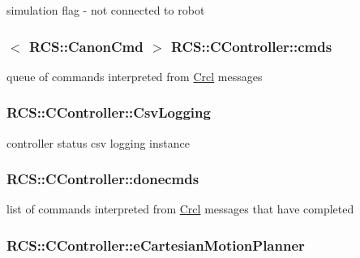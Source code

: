 simulation flag -\/ not connected to robot \hypertarget{structRCS_1_1CController_adceba05ebd7fa94f93c131db84840d29}{
\subsubsection[{cmds}]{$<$ {\bf R\-C\-S\-::\-Canon\-Cmd} $>$ R\-C\-S\-::\-C\-Controller\-::cmds\hspace{0.3cm}{\ttfamily [static]}}}\label{structRCS_1_1CController_adceba05ebd7fa94f93c131db84840d29}
queue of commands interpreted from \hyperlink{namespaceCrcl}{Crcl} messages \hypertarget{structRCS_1_1CController_a7e21b1156fe37407bae1ba468815206c}{
\subsubsection[{Csv\-Logging}]{ R\-C\-S\-::\-C\-Controller\-::\-Csv\-Logging\hspace{0.3cm}{\ttfamily [static]}}}\label{structRCS_1_1CController_a7e21b1156fe37407bae1ba468815206c}
controller status csv logging instance \hypertarget{structRCS_1_1CController_a093ccebe77526dc736b0ddff70dec0fc}{
\subsubsection[{donecmds}]{ R\-C\-S\-::\-C\-Controller\-::donecmds\hspace{0.3cm}{\ttfamily [static]}}}\label{structRCS_1_1CController_a093ccebe77526dc736b0ddff70dec0fc}
list of commands interpreted from \hyperlink{namespaceCrcl}{Crcl} messages that have completed \hypertarget{structRCS_1_1CController_a4174fd5467045e780fe53bde42e70735}{
\subsubsection[{e\-Cartesian\-Motion\-Planner}]{ R\-C\-S\-::\-C\-Controller\-::e\-Cartesian\-Motion\-Planner}}\label{structRCS_1_1CController_a4174fd5467045e780fe53bde42e70735}
